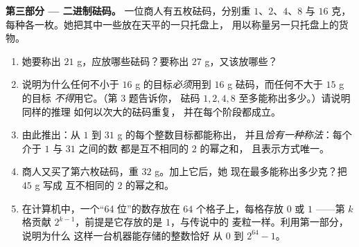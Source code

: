 \begin{problem}[{周末问题 --- 等比数列求和
$1 + 2 + 4 + \dots + 2^{n-1} = 2^n - 1$，由一个著名传说通向
二进制数}]
\medskip
\noindent\textbf{第三部分 --- 二进制砝码。}
一位商人有五枚砝码，分别重 $1$、$2$、$4$、$8$ 与 $16$ 克，
每种各一枚。她把其中一些放在天平的一只托盘上，
用以称量另一只托盘上的货物。
\begin{enumerate}[resume]
  \item 她要称出 $21$ g，应放哪些砝码？要称出
        $27$ g，又该放哪些？
  \item 说明为什么任何不小于 $16$ g 的目标\emph{必须}用到
        $16$ g 砝码，而任何不大于 $15$ g 的目标
        \emph{不得}用它。（第 3 题告诉你，
        砝码 $1, 2, 4, 8$ 至多能称出多少。）请说明同样的推理
        如何以次大的砝码重复，
        并在每个阶段都成立。
  \item 由此推出：从 $1$ 到 $31$ g 的每个整数目标都能称出，
        并且\emph{恰有一种称法}：每个介于 $1$ 与 $31$ 之间的数
        都是互不相同的 $2$ 的幂之和，
        且表示方式唯一。
  \item 商人又买了第六枚砝码，重 $32$ g。加上它后，她
        现在最多能称出多少克？把 $45$ g 写成
        互不相同的 $2$ 的幂之和。
  \item 在计算机中，一个“64 位”的数存放在 $64$
        个格子上，每格存放 $0$ 或 $1$ ——第 $k$
        格贡献 $2^{k-1}$，前提是它存放的是 $1$，与传说中的
        麦粒一样。利用第一部分，说明为什么
        这样一台机器能存储的整数恰好
        从 $0$ 到 $2^{64} - 1$。
\end{enumerate}
\end{problem}
